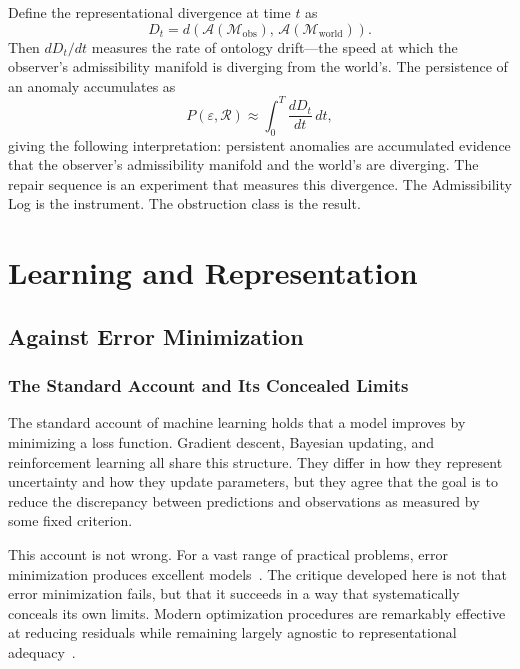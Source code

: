 \documentclass[12pt,oneside]{book}
\theoremstyle{plain}
\theoremstyle{definition}
\theoremstyle{remark}
\newcommand{\R}{\mathcal{R}}
\newcommand{\M}{\mathcal{M}}
\newcommand{\eps}{\varepsilon}
\newcommand{\1}{\mathbf{1}}
\begin{document}
\begin{derivbox}[frametitle={Derivation: Representational Divergence}]
Define the representational divergence at time $t$ as
\[
D_t = d\!\left(\mathcal{A}(\M_{\mathrm{obs}}),\, \mathcal{A}(\M_{\mathrm{world}})\right).
\]
Then $dD_t/dt$ measures the rate of ontology drift---the speed at which the observer's admissibility manifold is diverging from the world's. The persistence of an anomaly accumulates as
\[
P(\eps, \R) \approx \int_0^T \frac{dD_t}{dt}\, dt,
\]
giving the following interpretation: persistent anomalies are accumulated evidence that the observer's admissibility manifold and the world's are diverging. The repair sequence is an experiment that measures this divergence. The Admissibility Log is the instrument. The obstruction class is the result.
\end{derivbox}

\part{Learning and Representation}

\chapter{Against Error Minimization}

\section{The Standard Account and Its Concealed Limits}

The standard account of machine learning holds that a model improves by minimizing a loss function. Gradient descent, Bayesian updating, and reinforcement learning all share this structure. They differ in how they represent uncertainty and how they update parameters, but they agree that the goal is to reduce the discrepancy between predictions and observations as measured by some fixed criterion.

This account is not wrong. For a vast range of practical problems, error minimization produces excellent models~\cite{goodfellow2016,shalev2014}. The critique developed here is not that error minimization fails, but that it succeeds in a way that systematically conceals its own limits. Modern optimization procedures are remarkably effective at reducing residuals while remaining largely agnostic to representational adequacy~\cite{wimsatt2007,simon1969}.
\end{document}
